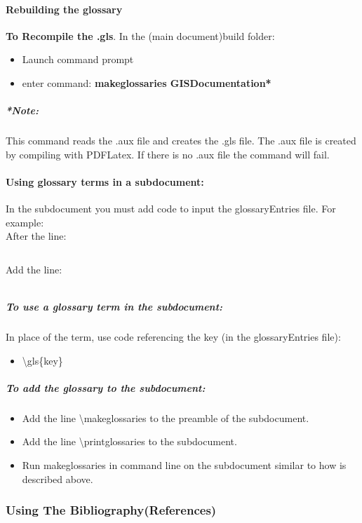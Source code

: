 \documentclass[class=book , crop=false]{standalone}
\begin{document}
\paragraph{Rebuilding the glossary}
\textbf{To Recompile the .gls}.  In the (main document)build folder:
\begin{itemize}
\item Launch command prompt
\item enter command: \textbf{{\large makeglossaries GISDocumentation*}}
\end{itemize}
\subparagraph*{*Note:} {\footnotesize This command reads the .aux file and creates the .gls file.  The .aux file is created by compiling with PDFLatex.  If there is no .aux file the command will fail.}
\paragraph{Using glossary terms in a subdocument:}
In the subdocument you must add code to input the glossaryEntries file.  For example:\\
After the line:
\begin{verbatim}

\end{verbatim}
Add the line:
\begin{verbatim}

\end{verbatim}
\subparagraph[To use a glossary term]{To use a glossary term in the subdocument:\texorpdfstring{\\}{}}
In place of the term, use code referencing the key (in the glossaryEntries file):
\begin{itemize}
\item \textbackslash gls\{key\}
\end{itemize}
\subparagraph{To add the glossary to the subdocument:}
\begin{itemize}
\item Add the line \textbackslash makeglossaries to the preamble of the subdocument.
\item Add the line \textbackslash printglossaries to the subdocument.
\item Run makeglossaries in command line on the subdocument similar to how is described above.
\end{itemize}




\subsubsection[Using The Bibliography(References)]{{\Large Using The Bibliography(References)}}
\end{document}
